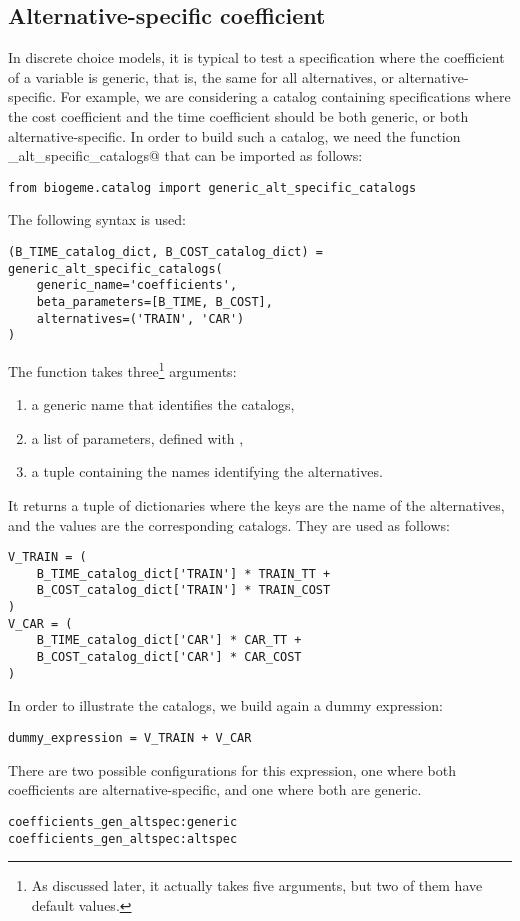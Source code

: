 \documentclass[12pt,a4paper]{article}
\begin{document}
\subsection{Alternative-specific coefficient}\label{sec:alt_spec}
In discrete choice models, it is typical to test a specification where
the coefficient of a variable is generic, that is, the same for all
alternatives, or alternative-specific. For example, we are considering a catalog containing
 specifications where the cost coefficient and the time coefficient
should be both generic, or both alternative-specific. In order to build such a catalog, we need the function \lstinline@generic_alt_specific_catalogs@ that can be imported as follows:
\begin{lstlisting}
from biogeme.catalog import generic_alt_specific_catalogs
\end{lstlisting}
The following syntax is used:
\begin{lstlisting}
(B_TIME_catalog_dict, B_COST_catalog_dict) = generic_alt_specific_catalogs(
    generic_name='coefficients',
    beta_parameters=[B_TIME, B_COST],
    alternatives=('TRAIN', 'CAR')
)
\end{lstlisting}
The function takes three\footnote{As discussed later, it actually takes five arguments, but two of them have default values.} arguments:
\begin{enumerate}
\item a generic name that identifies the catalogs,
\item a list of parameters, defined with \lstinline@Beta@,
\item a tuple containing the names identifying the alternatives. 
\end{enumerate}
It returns a tuple of dictionaries where the keys are the name of the alternatives, and the values are the corresponding catalogs. They are used as follows:
\begin{lstlisting}
V_TRAIN = (
    B_TIME_catalog_dict['TRAIN'] * TRAIN_TT +
    B_COST_catalog_dict['TRAIN'] * TRAIN_COST
)
V_CAR = (
    B_TIME_catalog_dict['CAR'] * CAR_TT +
    B_COST_catalog_dict['CAR'] * CAR_COST
)
\end{lstlisting}
In order to illustrate the catalogs, we build again a dummy expression:
\begin{lstlisting}
dummy_expression = V_TRAIN + V_CAR
\end{lstlisting}
There are two possible configurations for this expression, one where both coefficients are alternative-specific, and one where both are generic.
\begin{lstlisting}
coefficients_gen_altspec:generic
coefficients_gen_altspec:altspec
\end{lstlisting}
\end{document}
